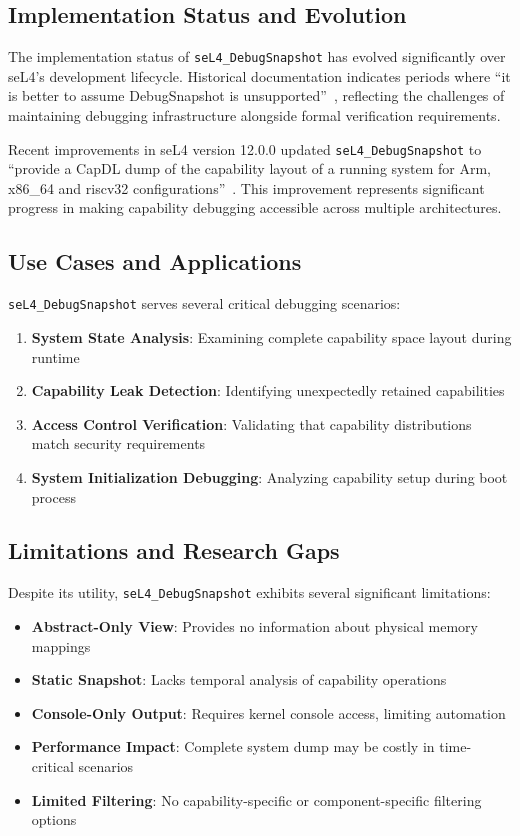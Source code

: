 \documentclass[11pt,a4paper]{article}
\begin{document}
\subsection{Implementation Status and Evolution}

The implementation status of \texttt{seL4\_DebugSnapshot} has evolved significantly over seL4's development lifecycle. Historical documentation indicates periods where ``it is better to assume DebugSnapshot is unsupported''~\cite{sel4-mailing-list-2018}, reflecting the challenges of maintaining debugging infrastructure alongside formal verification requirements.

Recent improvements in seL4 version 12.0.0 updated \texttt{seL4\_DebugSnapshot} to ``provide a CapDL dump of the capability layout of a running system for Arm, x86\_64 and riscv32 configurations''~\cite{sel4-changelog}. This improvement represents significant progress in making capability debugging accessible across multiple architectures.

\subsection{Use Cases and Applications}

\texttt{seL4\_DebugSnapshot} serves several critical debugging scenarios:

\begin{enumerate}
\item \textbf{System State Analysis}: Examining complete capability space layout during runtime
\item \textbf{Capability Leak Detection}: Identifying unexpectedly retained capabilities
\item \textbf{Access Control Verification}: Validating that capability distributions match security requirements
\item \textbf{System Initialization Debugging}: Analyzing capability setup during boot process
\end{enumerate}

\subsection{Limitations and Research Gaps}

Despite its utility, \texttt{seL4\_DebugSnapshot} exhibits several significant limitations:

\begin{itemize}
\item \textbf{Abstract-Only View}: Provides no information about physical memory mappings
\item \textbf{Static Snapshot}: Lacks temporal analysis of capability operations
\item \textbf{Console-Only Output}: Requires kernel console access, limiting automation
\item \textbf{Performance Impact}: Complete system dump may be costly in time-critical scenarios
\item \textbf{Limited Filtering}: No capability-specific or component-specific filtering options
\end{itemize}
\end{document}
